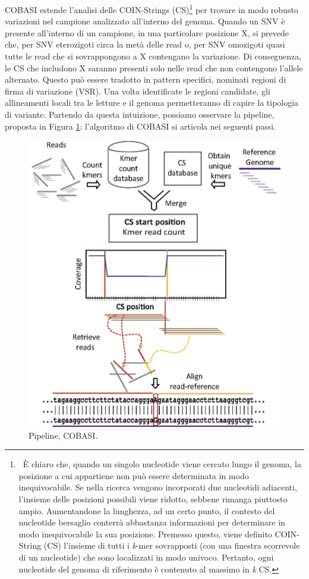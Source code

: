 \documentclass[../main.tex]{subfiles}
\begin{document}
COBASI estende l'analisi delle COIN-Strings (CS)\footnote{\ È chiaro che, quando un singolo nucleotide viene cercato lungo il genoma, la posizione a cui appartiene non può essere determinata in modo inequivocabile. Se nella ricerca vengono incorporati due nucleotidi adiacenti, l'insieme delle posizioni possibili viene ridotto, sebbene rimanga piuttosto ampio. Aumentandone la lunghezza, ad un certo punto, il contesto del nucleotide bersaglio conterrà abbastanza informazioni per determinare in modo inequivocabile la sua posizione. Premesso questo, viene definito COIN-String (CS) l'insieme di tutti i \textit{k}-mer sovrapposti (con una finestra scorrevole di un nucleotide) che sono localizzati in modo univoco. Pertanto, ogni nucleotide del genoma di riferimento è contenuto al massimo in \textit{k} CS.} per trovare in modo robusto variazioni nel campione analizzato all'interno del genoma. Quando un SNV è presente all'interno di un campione, in una particolare posizione X, si prevede che, per SNV eterozigoti circa la metà delle read o, per SNV omozigoti quasi tutte le read che si sovrappongono a X contengano la variazione. Di conseguenza, le CS che includono X saranno presenti solo nelle read che non contengono l'allele alternato. Questo può essere tradotto in pattern specifici, nominati regioni di firma di variazione (VSR). Una volta identificate le regioni candidate, gli allineamenti locali tra le letture e il genoma permetteranno di capire la tipologia di variante. Partendo da questa intuizione, possiamo osservare la pipeline, proposta in Figura \ref{fig:cobasi}: l'algoritmo di COBASI si articola nei seguenti passi.

 \begin{figure}[h!]
	\centering
  	\captionsetup{justification=centering}
 	\includegraphics[scale=.20]{images/cobasi_pipeline.png}
  	\caption{Pipeline, COBASI.}
  	\label{fig:cobasi}
\end{figure}
\end{document}

